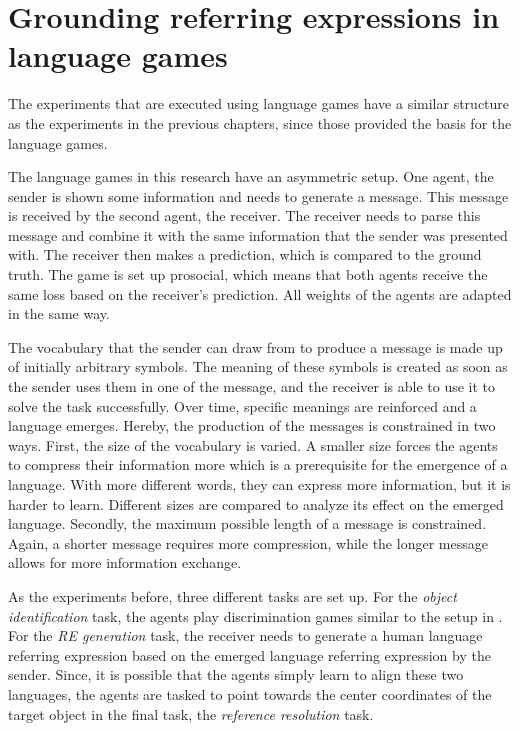 \section{Grounding referring expressions in language games}
\label{sec:language-games}
The experiments that are executed using language games have a similar structure as the experiments in the previous chapters, since those provided the basis for the language games.

The language games in this research have an asymmetric setup.
One agent, the sender is shown some information and needs to generate a message.
This message is received by the second agent, the receiver.
The receiver needs to parse this message and combine it with the same information that the sender was presented with.
The receiver then makes a prediction, which is compared to the ground truth.
The game is set up prosocial, which means that both agents receive the same loss based on the receiver's prediction.
All weights of the agents are adapted in the same way.

The vocabulary that the sender can draw from to produce a message is made up of initially arbitrary symbols.
The meaning of these symbols is created as soon as the sender uses them in one of the message, and the receiver is able to use it to solve the task successfully.
Over time, specific meanings are reinforced and a language emerges.
Hereby, the production of the messages is constrained in two ways.
First, the size of the vocabulary is varied.
A smaller size forces the agents to compress their information more which is a prerequisite for the emergence of a language.
With more different words, they can express more information, but it is harder to learn.
Different sizes are compared to analyze its effect on the emerged language.
Secondly, the maximum possible length of a message is constrained.
Again, a shorter message requires more compression, while the longer message allows for more information exchange.

As the experiments before, three different tasks are set up.
For the \emph{object identification} task, the agents play discrimination games similar to the setup in \citep{Lazaridou2017}.
For the \emph{RE generation} task, the receiver needs to generate a human language referring expression based on the emerged language referring expression by the sender.
Since, it is possible that the agents simply learn to align these two languages, the agents are tasked to point towards the center coordinates of the target object in the final task, the \emph{reference resolution} task.

